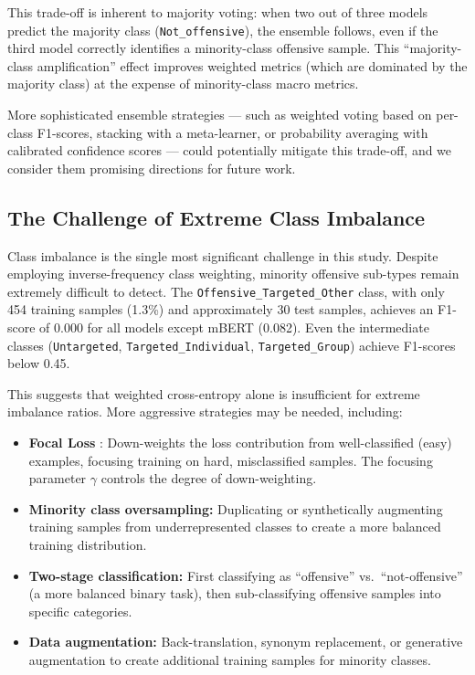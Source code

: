 \documentclass[12pt, a4paper]{article}
\begin{document}
This trade-off is inherent to majority voting: when two out of three models predict the majority class (\texttt{Not\_offensive}), the ensemble follows, even if the third model correctly identifies a minority-class offensive sample. This ``majority-class amplification'' effect improves weighted metrics (which are dominated by the majority class) at the expense of minority-class macro metrics.

More sophisticated ensemble strategies --- such as weighted voting based on per-class F1-scores, stacking with a meta-learner, or probability averaging with calibrated confidence scores --- could potentially mitigate this trade-off, and we consider them promising directions for future work.

\subsection{The Challenge of Extreme Class Imbalance}

Class imbalance is the single most significant challenge in this study. Despite employing inverse-frequency class weighting, minority offensive sub-types remain extremely difficult to detect. The \texttt{Offensive\_Targeted\_Other} class, with only 454 training samples (1.3\%) and approximately 30 test samples, achieves an F1-score of 0.000 for all models except mBERT (0.082). Even the intermediate classes (\texttt{Untargeted}, \texttt{Targeted\_Individual}, \texttt{Targeted\_Group}) achieve F1-scores below 0.45.

This suggests that weighted cross-entropy alone is insufficient for extreme imbalance ratios. More aggressive strategies may be needed, including:

\begin{itemize}[leftmargin=2em]
    \item \textbf{Focal Loss} \citep{lin2017focal}: Down-weights the loss contribution from well-classified (easy) examples, focusing training on hard, misclassified samples. The focusing parameter $\gamma$ controls the degree of down-weighting.
    
    \item \textbf{Minority class oversampling:} Duplicating or synthetically augmenting training samples from underrepresented classes to create a more balanced training distribution.
    
    \item \textbf{Two-stage classification:} First classifying as ``offensive'' vs.\ ``not-offensive'' (a more balanced binary task), then sub-classifying offensive samples into specific categories.
    
    \item \textbf{Data augmentation:} Back-translation, synonym replacement, or generative augmentation to create additional training samples for minority classes.
\end{itemize}
\end{document}
